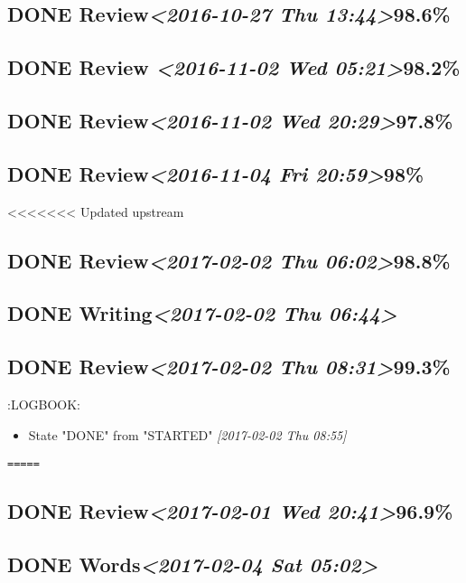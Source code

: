 \documentclass[11pt]{ctexart}
\begin{document}
\subsection{{\bfseries\sffamily DONE} Review\textit{<2016-10-27 Thu 13:44>}98.6\%}
\label{sec:org1d72aac}
\subsection{{\bfseries\sffamily DONE} Review \textit{<2016-11-02 Wed 05:21>}98.2\%}
\label{sec:org02a4898}
\subsection{{\bfseries\sffamily DONE} Review\textit{<2016-11-02 Wed 20:29>}97.8\%}
\label{sec:orge573e1f}
\subsection{{\bfseries\sffamily DONE} Review\textit{<2016-11-04 Fri 20:59>}98\%}
\label{sec:orgc6893c9}
<<<<<<< Updated upstream
\subsection{{\bfseries\sffamily DONE} Review\textit{<2017-02-02 Thu 06:02>}98.8\%}
\label{sec:org69ad438}
\subsection{{\bfseries\sffamily DONE} Writing\textit{<2017-02-02 Thu 06:44>}}
\label{sec:org0f98c7c}
\subsection{{\bfseries\sffamily DONE} Review\textit{<2017-02-02 Thu 08:31>}99.3\%}
\label{sec:orgc4162cb}
:LOGBOOK:
\begin{itemize}
\item State "DONE"       from "STARTED"    \textit{[2017-02-02 Thu 08:55]}
\end{itemize}
\texttt{=====}
\subsection{{\bfseries\sffamily DONE} Review\textit{<2017-02-01 Wed 20:41>}96.9\%}
\label{sec:org32cea08}
\subsection{{\bfseries\sffamily DONE} Words\textit{<2017-02-04 Sat 05:02>}}
\label{sec:orgd425724}
\end{document}
